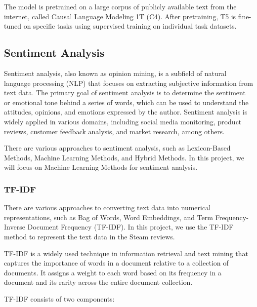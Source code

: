 \documentclass{article}
\begin{document}
The model is pretrained on a large corpus of publicly available text from the internet, called Causal Language Modeling 1T (C4). After pretraining, T5 is fine-tuned on specific tasks using supervised training on individual task datasets.



\subsection{Sentiment Analysis}
Sentiment analysis, also known as opinion mining, is a subfield of natural language processing (NLP) that focuses on extracting subjective information from text data. The primary goal of sentiment analysis is to determine the sentiment or emotional tone behind a series of words, which can be used to understand the attitudes, opinions, and emotions expressed by the author. Sentiment analysis is widely applied in various domains, including social media monitoring, product reviews, customer feedback analysis, and market research, among others.

There are various approaches to sentiment analysis, such as Lexicon-Based Methods, Machine Learning Methods, and Hybrid Methods. In this project, we will focus on Machine Learning Methods for sentiment analysis. 

\subsubsection{TF-IDF}

There are various approaches to converting text data into numerical representations, such as Bag of Words, Word Embeddings, and Term Frequency-Inverse Document Frequency (TF-IDF). In this project, we use the TF-IDF method to represent the text data in the Steam reviews.


TF-IDF is a widely used technique in information retrieval and text mining that captures the importance of words in a document relative to a collection of documents. It assigns a weight to each word based on its frequency in a document and its rarity across the entire document collection.

TF-IDF consists of two components:
\end{document}
